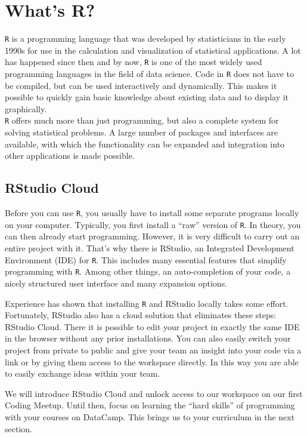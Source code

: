 \documentclass[
  11pt,
]{book}
\begin{document}
\hypertarget{whats-r}{%
\section{What's R?}\label{whats-r}}

\texttt{R} is a programming language that was developed by statisticians in the early 1990s for use in the calculation and visualization of statistical applications. A lot has happened since then and by now, \texttt{R} is one of the most widely used programming languages in the field of data science. Code in \texttt{R} does not have to be compiled, but can be used interactively and dynamically. This makes it possible to quickly gain basic knowledge about existing data and to display it graphically.\\
\texttt{R} offers much more than just programming, but also a complete system for solving statistical problems. A large number of packages and interfaces are available, with which the functionality can be expanded and integration into other applications is made possible.

\hypertarget{rstudio-cloud}{%
\subsection{RStudio Cloud}\label{rstudio-cloud}}

Before you can use \texttt{R}, you usually have to install some separate programs locally on your computer. Typically, you first install a ``raw'' version of \texttt{R}. In theory, you can then already start programming. However, it is very difficult to carry out an entire project with it. That's why there is RStudio, an Integrated Development Environment (IDE) for \texttt{R}. This includes many essential features that simplify programming with \texttt{R}. Among other things, an auto-completion of your code, a nicely structured user interface and many expansion options.

Experience has shown that installing \texttt{R} and RStudio locally takes some effort. Fortunately, RStudio also has a cloud solution that eliminates these steps: RStudio Cloud. There it is possible to edit your project in exactly the same IDE in the browser without any prior installations. You can also easily switch your project from private to public and give your team an insight into your code via a link or by giving them access to the workspace directly. In this way you are able to easily exchange ideas within your team.

We will introduce RStudio Cloud and unlock access to our workspace on our first Coding Meetup. Until then, focus on learning the ``hard skills'' of programming with your courses on DataCamp. This brings us to your curriculum in the next section.
\end{document}
